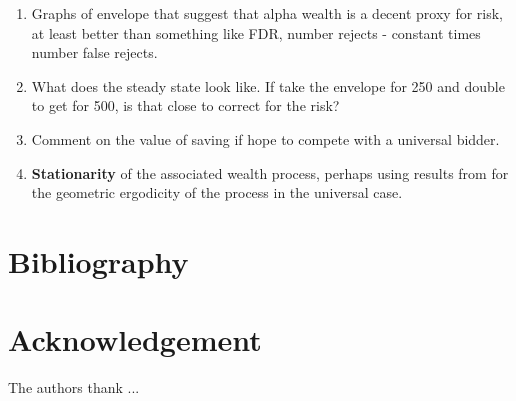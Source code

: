 \documentclass[12pt]{article}
\begin{document}
 \begin{enumerate}

 \item Graphs of envelope that suggest that alpha wealth is a decent proxy for
 risk, at least better than something like FDR, number rejects - constant times
 number false rejects.

 \item What does the steady state look like.  If take the envelope for 250 and
 double to get for 500, is that close to correct for the risk?

 \item Comment on the value of saving if hope to compete with a universal
 bidder.
 
\item {\bf Stationarity} of the associated wealth process, perhaps using results
 from \citet{chanTong94} for the geometric ergodicity of the process in the
 universal case.

\end{enumerate}



\section{ Bibliography }
\section*{Acknowledgement}

The authors thank ...





\end{document}
